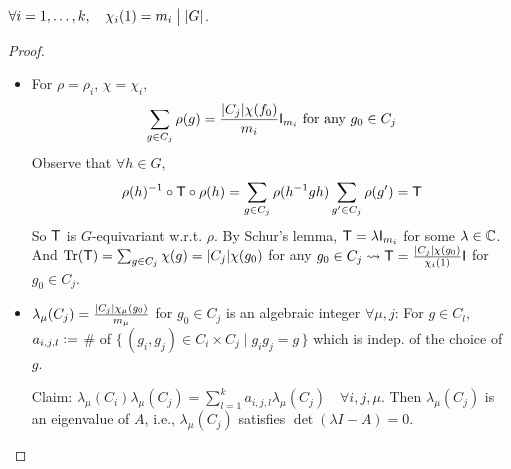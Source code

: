 \begin{theorem}[Divisibility]
  $\forall i = 1, \dots, k, \quad \chi_i(1) = m_i \mathrel{\big|} \lvert G\rvert$.

  \begin{proof} \mbox{}
    \begin{itemize}
      \item For $\rho=\rho_i$, $\chi = \chi_i$,
        \[
          \sum_{g\in C_j} \rho(g) = \frac{\lvert C_j\rvert\chi(f_0)}{m_i}
          {\sf I}_{m_i} \text{~for any~} g_0 \in C_j
        \]
        Observe that $\forall h \in G$,
        \[
          \rho(h)^{-1}\circ{\sf T}\circ\rho(h) = \sum_{g\in C_j} \rho(h^{-1}gh)
          \sum_{g'\in C_j} \rho(g') = {\sf T}
        \]
        So ${\sf T}$ is $G$-equivariant w.r.t. $\rho$.
        By Schur's lemma, ${\sf T} = \lambda {\sf I}_{m_i}$ for some $\lambda \in \mathbb{C}$.
        And $\operatorname{Tr}({\sf T}) = \sum_{g\in C_j} \chi(g) = \lvert C_j\rvert\chi(g_0)$
        for any $g_0 \in C_j \leadsto {\sf T} =
        \frac{\lvert C_j\rvert\chi(g_0)}{\chi_i(1)} {\sf I}$ for $g_0 \in C_j$.
      \item $\lambda_\mu(C_j) = \frac{\lvert C_j\rvert\chi_\mu(g_0)}{m_\mu}$ for
        $g_0 \in C_j$ is an algebraic integer $\forall \mu, j$:
        For $g\in C_l$, $a_{i,j,l} \vcentcolon=$ \# of $\{\, (g_i, g_j) \in C_i \times C_j \mid
        g_ig_j = g \,\}$ which is indep. of the choice of $g$.

        Claim: $\lambda_\mu(C_i)\lambda_\mu(C_j) = \sum_{l=1}^k a_{i,j,l} \lambda_\mu(C_j)
        \quad \forall i, j, \mu$. Then $\lambda_\mu(C_j)$ is an eigenvalue of
        $A$, i.e., $\lambda_\mu(C_j)$ satisfies $\det(\lambda I - A) = 0$.


\end{itemize}
\end{proof}
\end{theorem}
